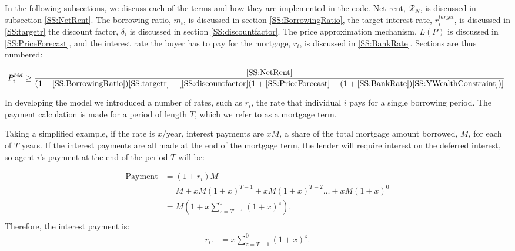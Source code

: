 In the following subsections, we discuss each of the terms and how they are implemented in the code. Net rent, $\mathcal{R}_N$, is discussed in subsection \ref{SS:NetRent}. The borrowing ratio, $m_i$, is discussed in section \ref{SS:BorrowingRatio}, the target interest rate, $r_i^{target}$, is discussed in \ref{SS:targetr} the discount factor, $\delta_i$ is discussed in section \ref{SS:discountfactor}. The price approximation mechanism, $L(P)$ is discussed in \ref{SS:PriceForecast}, and the interest rate the buyer has to pay for the mortgage, $r_i$, is discussed in \ref{SS:BankRate}. Sections are thus numbered: 

\begin{align*}
P_i^{bid} \ge   \frac{\ref{SS:NetRent}} {(1-\ref{SS:BorrowingRatio})\ref{SS:targetr}-
\left[ \ref{SS:discountfactor}(1+\ref{SS:PriceForecast}- (1+\ref{SS:BankRate})\ref{SS:YWealthConstraint})\right]}. 
\end{align*}

In developing the model we introduced a number of rates, such as $r_i$, the rate that individual $i$ pays for a single borrowing period. The payment calculation is made for a period of length $T$, which we refer to as a mortgage term.

Taking a simplified example, if the rate is $x$/year, interest payments are $xM$, a share of the total mortgage amount borrowed, $M$, for each of $T$ years. 
If the interest payments are all made at the end of the mortgage term, the lender will require interest on the deferred interest, so agent $i$'s payment at the end of the period $T$ will be:

\begin{align*}
\text{Payment} &= (1+r_i)M                                            \\ 
    &= M + xM(1+x)^{T-1}+ xM(1+x)^{T-2}\dots + xM(1+x)^{0} \\
    &= M\left(1+ x\sum_{z=T-1}^0(1+x)^{z}\right).          \\ 
\end{align*}
Therefore, the interest payment is:
\begin{align*}
r_i.   &=x\sum_{z=T-1}^0(1+x)^{z}.
\end{align*}

